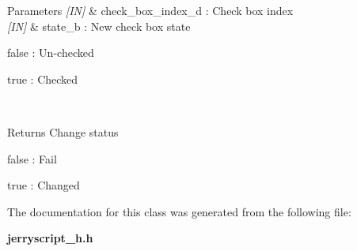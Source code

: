 \begin{DoxyCode}{0}
\end{DoxyCode}



\begin{DoxyParams}{Parameters}
{\em \mbox{[}\+I\+N\mbox{]}} & check\+\_\+box\+\_\+index\+\_\+d \+: Check box index \\
\hline
{\em \mbox{[}\+I\+N\mbox{]}} & state\+\_\+b \+: New check box state \begin{DoxyItemize}
\item false \+: Un-\/checked \item true \+: Checked \end{DoxyItemize}
\\
\hline
\end{DoxyParams}
\begin{DoxyReturn}{Returns}
Change status \begin{DoxyItemize}
\item false \+: Fail \item true \+: Changed \end{DoxyItemize}

\end{DoxyReturn}


The documentation for this class was generated from the following file\+:\begin{DoxyCompactItemize}
\item 
\textbf{ jerryscript\+\_\+h.\+h}\end{DoxyCompactItemize}

